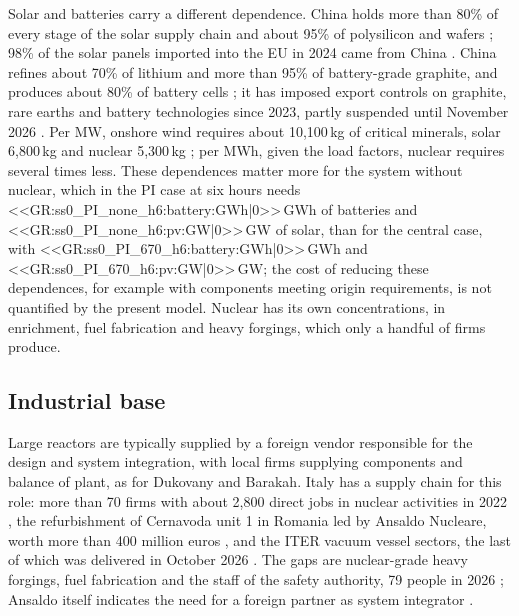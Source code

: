 Solar and batteries carry a different dependence. China holds more than 80\% of every stage of the solar supply chain and about 95\% of polysilicon and wafers \citep{IEApv2022}; 98\% of the solar panels imported into the EU in 2024 came from China \citep{Eurostat2025}. China refines about 70\% of lithium and more than 95\% of battery-grade graphite, and produces about 80\% of battery cells \citep{IEAgcmo2025}; it has imposed export controls on graphite, rare earths and battery technologies since 2023, partly suspended until November 2026 \citep{HSFchina2025}. Per MW, onshore wind requires about 10{,}100\,kg of critical minerals, solar 6{,}800\,kg and nuclear 5{,}300\,kg \citep{WNAminerals}; per MWh, given the load factors, nuclear requires several times less. These dependences matter more for the system without nuclear, which in the PI case at six hours needs <<GR:ss0_PI_none_h6:battery:GWh|0>>\,GWh of batteries and <<GR:ss0_PI_none_h6:pv:GW|0>>\,GW of solar, than for the central case, with <<GR:ss0_PI_670_h6:battery:GWh|0>>\,GWh and <<GR:ss0_PI_670_h6:pv:GW|0>>\,GW; the cost of reducing these dependences, for example with components meeting origin requirements, is not quantified by the present model. Nuclear has its own concentrations, in enrichment, fuel fabrication and heavy forgings, which only a handful of firms produce.


\subsection{Industrial base}
Large reactors are typically supplied by a foreign vendor responsible for the design and system integration, with local firms supplying components and balance of plant, as for Dukovany and Barakah. Italy has a supply chain for this role: more than 70 firms with about 2{,}800 direct jobs in nuclear activities in 2022 \citep{TEHA2024}, the refurbishment of Cernavoda unit 1 in Romania led by Ansaldo Nucleare, worth more than 400 million euros \citep{Cernavoda2024}, and the ITER vacuum vessel sectors, the last of which was delivered in October 2026 \citep{ITER2026}. The gaps are nuclear-grade heavy forgings, fuel fabrication \citep{Confindustria2025} and the staff of the safety authority, 79 people in 2026 \citep{ISIN2026}; Ansaldo itself indicates the need for a foreign partner as system integrator \citep{Ansaldo2026}.


